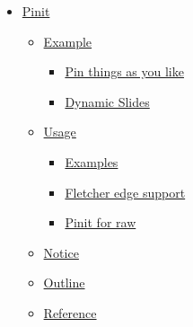 \begin{itemize}
\tightlist
\item
  \href{https://github.com/typst/packages/raw/main/packages/preview/pinit/0.2.2/\#pinit}{Pinit}

  \begin{itemize}
  \tightlist
  \item
    \href{https://github.com/typst/packages/raw/main/packages/preview/pinit/0.2.2/\#example}{Example}

    \begin{itemize}
    \tightlist
    \item
      \href{https://github.com/typst/packages/raw/main/packages/preview/pinit/0.2.2/\#pin-things-as-you-like}{Pin
      things as you like}
    \item
      \href{https://github.com/typst/packages/raw/main/packages/preview/pinit/0.2.2/\#dynamic-slides}{Dynamic
      Slides}
    \end{itemize}
  \item
    \href{https://github.com/typst/packages/raw/main/packages/preview/pinit/0.2.2/\#usage}{Usage}

    \begin{itemize}
    \tightlist
    \item
      \href{https://github.com/typst/packages/raw/main/packages/preview/pinit/0.2.2/\#examples}{Examples}
    \item
      \href{https://github.com/typst/packages/raw/main/packages/preview/pinit/0.2.2/\#fletcher-edge-support}{Fletcher
      edge support}
    \item
      \href{https://github.com/typst/packages/raw/main/packages/preview/pinit/0.2.2/\#pinit-for-raw}{Pinit
      for raw}
    \end{itemize}
  \item
    \href{https://github.com/typst/packages/raw/main/packages/preview/pinit/0.2.2/\#notice}{Notice}
  \item
    \href{https://github.com/typst/packages/raw/main/packages/preview/pinit/0.2.2/\#outline}{Outline}
  \item
    \href{https://github.com/typst/packages/raw/main/packages/preview/pinit/0.2.2/\#reference}{Reference}


\end{itemize}
\end{itemize}
